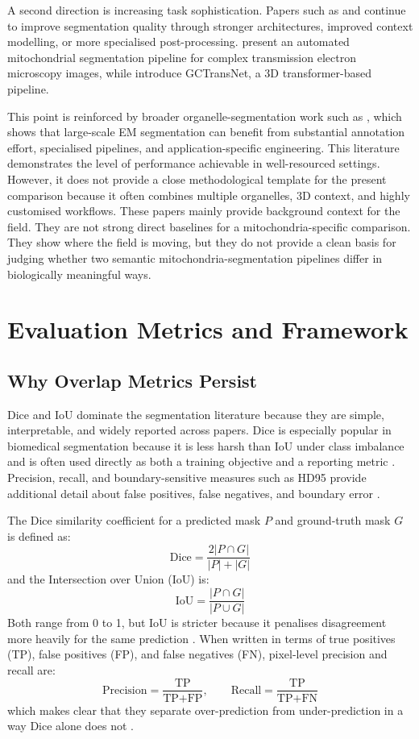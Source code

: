 \documentclass[logo,bsc,singlespacing,parskip,online]{infthesis}
\begin{document}
A second direction is increasing task sophistication. Papers such as
\citet{jang2025deep} and \citet{chen2025gctransnet} continue to improve
segmentation quality through stronger architectures, improved context modelling,
or more specialised post-processing. \citet{jang2025deep} present an automated
mitochondrial segmentation pipeline for complex transmission electron microscopy
images, while
\citet{chen2025gctransnet} introduce GCTransNet, a 3D transformer-based
pipeline. 

This point is reinforced by broader organelle-segmentation work such as
\citet{heinrich2021wholecell}, which shows that large-scale EM segmentation can
benefit from substantial annotation effort, specialised pipelines, and
application-specific engineering. This literature demonstrates the level of 
performance achievable in well-resourced settings. However, it does not provide 
a close methodological template for the present comparison because it often 
combines multiple organelles, 3D context, and highly customised workflows. These papers
mainly provide background context for the field. They are not strong direct baselines for a
mitochondria-specific comparison. They show where the field is moving, but they
do not provide a clean basis for judging whether two semantic
mitochondria-segmentation pipelines differ in biologically meaningful ways.

\chapter{Evaluation Metrics and Framework}
\label{sec:bg-metrics}

\section{Why Overlap Metrics Persist}

Dice and IoU dominate the segmentation literature because they are simple,
interpretable, and widely reported across papers. Dice is especially popular in
biomedical segmentation because it is less harsh than IoU under class imbalance
and is often used directly as both a training objective and a reporting metric
\citep{taha2015metrics, franco-barranco2022stable, isensee2021nnu}.
Precision, recall, and boundary-sensitive measures such as HD95 provide
additional detail about false positives, false negatives, and boundary
error \citep{taha2015metrics}.

The Dice similarity coefficient for a predicted mask $P$ and ground-truth mask
$G$ is defined as:
\[
\text{Dice} = \frac{2 |P \cap G|}{|P| + |G|}
\]
and the Intersection over Union (IoU) is:
\[
\text{IoU} = \frac{|P \cap G|}{|P \cup G|}
\]
Both range from 0 to 1, but IoU is stricter because it penalises disagreement
more heavily for the same prediction \citep{taha2015metrics}. When written in terms of true
positives (TP), false positives (FP), and false negatives (FN), pixel-level
precision and recall are:
\[
\text{Precision} = \frac{\text{TP}}{\text{TP} + \text{FP}}, \qquad
\text{Recall} = \frac{\text{TP}}{\text{TP} + \text{FN}}
\]
which makes clear that they separate over-prediction from under-prediction in a
way Dice alone does not \citep{taha2015metrics}.
\end{document}
